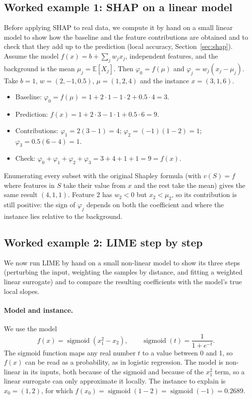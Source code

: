 \documentclass[11pt,a4paper]{article}
\begin{document}
\subsection{Worked example 1: SHAP on a linear model}\label{sec:shaphand}
Before applying SHAP to real data, we compute it by hand on a small linear
model to show how the baseline and the feature contributions are obtained and
to check that they add up to the prediction (local accuracy, Section~\ref{sec:shap}).
Assume the model $f(x) = b + \sum_j w_j x_j$, independent features, and the background is the mean $\mu_j = \mathbb{E}[X_j]$. Then $\varphi_0 = f(\mu)$ and $\varphi_j = w_j (x_j - \mu_j)$. Take $b = 1$, $w = (2, -1, 0.5)$, $\mu = (1, 2, 4)$ and the instance $x = (3, 1, 6)$.
\begin{itemize}
  \item Baseline: $\varphi_0 = f(\mu) = 1 + 2\cdot 1 - 1\cdot 2 + 0.5\cdot 4 = 3$.
  \item Prediction: $f(x) = 1 + 2\cdot 3 - 1\cdot 1 + 0.5\cdot 6 = 9$.
  \item Contributions: $\varphi_1 = 2(3 - 1) = 4$; $\varphi_2 = (-1)(1 - 2) = 1$; $\varphi_3 = 0.5(6 - 4) = 1$.
  \item Check: $\varphi_0 + \varphi_1 + \varphi_2 + \varphi_3 = 3 + 4 + 1 + 1 = 9 = f(x)$.
\end{itemize}
Enumerating every subset with the original Shapley formula (with $v(S) = f$ where features in $S$ take their value from $x$ and the rest take the mean) gives the same result $(4, 1, 1)$. Feature 2 has $w_2 < 0$ but $x_2 < \mu_2$, so its contribution is still positive: the sign of $\varphi_j$ depends on both the coefficient and where the instance lies relative to the background.

\subsection{Worked example 2: LIME step by step}\label{sec:limehand}
We now run LIME by hand on a small non-linear model to show its three steps
(perturbing the input, weighting the samples by distance, and fitting a
weighted linear surrogate) and to compare the resulting coefficients with the
model's true local slopes.

\paragraph{Model and instance.} We use the model
\begin{equation}
f(x) = \operatorname{sigmoid}(x_1^2 - x_2), \qquad
\operatorname{sigmoid}(t) = \frac{1}{1 + e^{-t}}.
\end{equation}
The sigmoid function maps any real number $t$ to a value between 0 and 1, so
$f(x)$ can be read as a probability, as in logistic regression. The model is non-linear in its inputs, both because of the sigmoid and because
of the $x_1^2$ term, so a linear surrogate can only approximate it locally. The instance to explain is $x_0 = (1, 2)$, for which
$f(x_0) = \operatorname{sigmoid}(1 - 2) = \operatorname{sigmoid}(-1) = 0.2689$.
\end{document}
